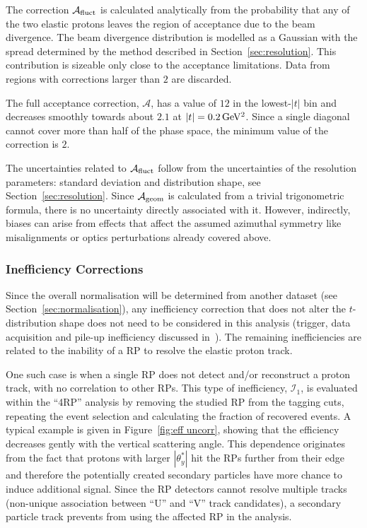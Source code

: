 The correction $\mathcal{A}_{\rm fluct}$ is calculated analytically from the probability that any of the two elastic protons leaves the region of acceptance due to the beam divergence. The beam divergence distribution is modelled as a Gaussian with the spread determined by the method described in Section~\ref{sec:resolution}. This contribution is sizeable only close to the acceptance limitations. Data from regions with corrections larger than $2$ are discarded.

The full acceptance correction, $\mathcal{A}$, has a value of $12$ in the lowest-$|t|$ bin and decreases smoothly towards about $2.1$ at $|t| = 0.2\,{\rm GeV^2}$. Since a single diagonal cannot cover more than half of the phase space, the minimum value of the correction is $2$.

The uncertainties related to $\mathcal{A}_{\rm fluct}$ follow from the uncertainties of the resolution parameters: standard deviation and distribution shape, see Section~\ref{sec:resolution}. Since $\mathcal{A}_{\rm geom}$ is calculated from a trivial trigonometric formula, there is no uncertainty directly associated with it. However, indirectly, biases can arise from effects that affect the assumed azimuthal symmetry like misalignments or optics perturbations already covered above.




\subsubsection{Inefficiency Corrections}
\label{sec:ineff corr}

Since the overall normalisation will be determined from another dataset (see Section~\ref{sec:normalisation}), any inefficiency correction that does not alter the $t$-distribution shape does not need to be considered in this analysis (trigger, data acquisition and pile-up inefficiency discussed in~\cite{epl101-el,prl111}). The remaining inefficiencies are related to the inability of a RP to resolve the elastic proton track.

One such case is when a single RP does not detect and/or reconstruct a proton track, with no correlation to other RPs. This type of inefficiency, $\mathcal{I}_1$, is evaluated within the ``4RP'' analysis by removing the studied RP from the tagging cuts, repeating the event selection and calculating the fraction of recovered events. A typical example is given in Figure~\ref{fig:eff uncorr}, showing that the efficiency decreases gently with the vertical scattering angle. This dependence originates from the fact that protons with larger $|\theta_y^*|$ hit the RPs further from their edge and therefore the potentially created secondary particles have more chance to induce additional signal. Since the RP detectors cannot resolve multiple tracks (non-unique association between ``U'' and ``V'' track candidates), a secondary particle track prevents from using the affected RP in the analysis.

